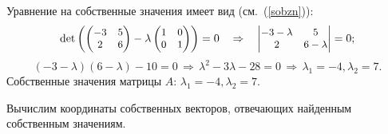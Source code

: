 \documentclass[10pt]{article}
\numberwithin{primer}{section}
\numberwithin{equation}{section}
\begin{document}
Уравнение на собственные значения имеет вид (см.~(\ref{sobzn})):
\begin{equation*}\small
\det\left(\begin{pmatrix}
-3 & 5\\
2 & 6\\
\end{pmatrix}-\lambda\begin{pmatrix}
1 & 0\\
0 & 1\\
\end{pmatrix}\right)=0\quad\Rightarrow\quad\begin{vmatrix}
-3-\lambda & 5\\
2 & 6-\lambda\\
\end{vmatrix}=0;
\end{equation*}
\[
\left(-3-\lambda\right)\left(6-\lambda\right)-10=0\,\Rightarrow\,\lambda^2-3\lambda-28=0\,\Rightarrow\,\lambda_1=-4,\lambda_2=7.
\]
Собственные значения матрицы $A$: $\lambda_1=-4,\lambda_2=7$.

Вычислим координаты собственных векторов, отвечающих найденным собственным значениям.
\end{document}
